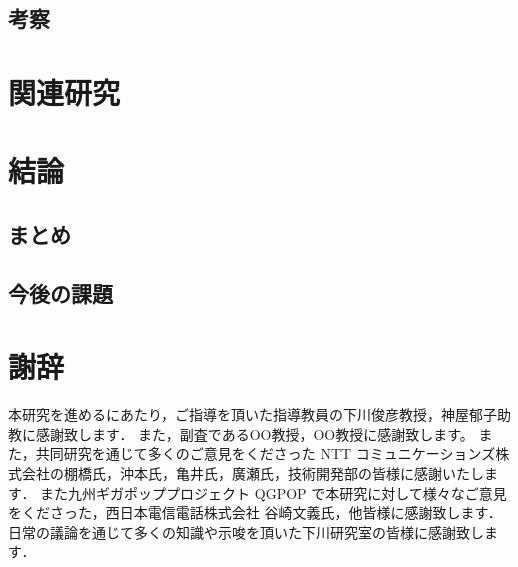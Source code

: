 \documentclass[a4j,12pt,onecolumn,oneside,titlepage,openany,final]{jreport}
\begin{document}
\section{考察}

\chapter{関連研究}\label{chap:Related_Research}
\section{}

\chapter{結論}\label{chap:Conclusion}
\section{まとめ}
\section{今後の課題}

\chapter*{謝辞}
本研究を進めるにあたり，ご指導を頂いた指導教員の下川俊彦教授，神屋郁子助教に感謝致します．
また，副査であるOO教授，OO教授に感謝致します。
また，共同研究を通じて多くのご意見をくださった NTT コミュニケーションズ株式会社の棚橋氏，沖本氏，亀井氏，廣瀬氏，技術開発部の皆様に感謝いたします．
また九州ギガポッププロジェクト QGPOP で本研究に対して様々なご意見をくださった，西日本電信電話株式会社 谷崎文義氏，他皆様に感謝致します．
日常の議論を通じて多くの知識や示唆を頂いた下川研究室の皆様に感謝致します．
\end{document}

